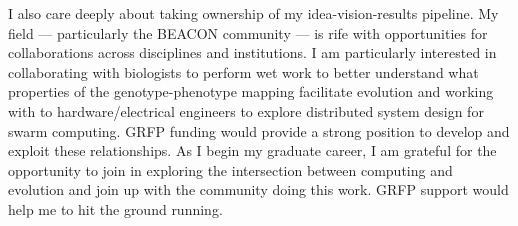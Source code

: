 I also care deeply about taking ownership of my idea-vision-results pipeline.
My field --- particularly the BEACON community --- is rife with opportunities for collaborations across disciplines and institutions.
I am particularly interested in collaborating with biologists to perform wet work to better understand what properties of the genotype-phenotype mapping facilitate evolution and working with to hardware/electrical engineers to explore distributed system design for swarm computing.
GRFP funding would provide a strong position to develop and exploit these relationships.
As I begin my graduate career, I am grateful for the opportunity to join in exploring the intersection between computing and evolution and join up with the community doing this work.
GRFP support would help me to hit the ground running.
